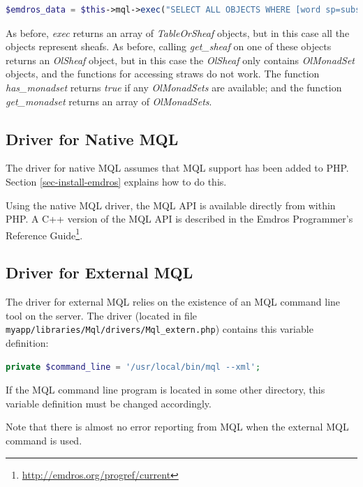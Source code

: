\documentclass[11pt,oneside,a4paper]{memoir}
\begin{document}
\begin{lstlisting}[language=PHP]
$emdros_data = $this->mql->exec("SELECT ALL OBJECTS WHERE [word sp=subs] GOqxqxqx", true);
\end{lstlisting}

As before, \emph{exec} returns an array of \emph{TableOrSheaf} objects, but in this case all the
objects represent sheafs. As before, calling \emph{get\_sheaf} on one of these objects returns an
\emph{OlSheaf} object, but in this case the \emph{OlSheaf} only contains \emph{OlMonadSet} objects, and the
functions for accessing straws do not work. The function \emph{has\_monadset} returns \emph{true} if
any \emph{OlMonadSets} are available; and the function \emph{get\_monadset} returns an array of
\emph{OlMonadSets}.

\subsection{Driver for Native MQL}\label{sec-mql-native}

The driver for native MQL assumes that MQL support has been added to PHP. Section
\ref{sec-install-emdros} explains how to do this.

Using the native MQL driver, the MQL API is available directly from within PHP. A C++
version of the MQL API is described in the Emdros Programmer's Reference
Guide\footnote{\url{http://emdros.org/progref/current}}.

\subsection{Driver for External MQL}\label{sec-mql-extern}

The driver for external MQL relies on the existence of an MQL command line tool on the server. The
driver (located in file \texttt{myapp/libraries/Mql/drivers/Mql\_extern.php}) contains this variable
definition:

\begin{lstlisting}[language=PHP]
private $command_line = '/usr/local/bin/mql --xml';
\end{lstlisting}

If the MQL command line program is located in some other directory, this variable definition must be
changed accordingly.

Note that there is almost no error reporting from MQL when the external MQL command is used.
\end{document}

